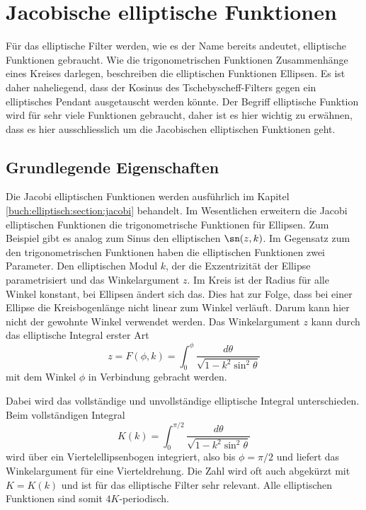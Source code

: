 \section{Jacobische elliptische Funktionen}

Für das elliptische Filter werden, wie es der Name bereits andeutet, elliptische Funktionen gebraucht.
Wie die trigonometrischen Funktionen Zusammenhänge eines Kreises darlegen, beschreiben die elliptischen Funktionen Ellipsen.
Es ist daher naheliegend, dass der Kosinus des Tschebyscheff-Filters gegen ein elliptisches Pendant ausgetauscht werden könnte.
Der Begriff elliptische Funktion wird für sehr viele Funktionen gebraucht, daher ist es hier wichtig zu erwähnen, dass es hier ausschliesslich um die Jacobischen elliptischen Funktionen geht.

\subsection{Grundlegende Eigenschaften}

Die Jacobi elliptischen Funktionen werden ausführlich im Kapitel \ref{buch:elliptisch:section:jacobi} behandelt.
Im Wesentlichen erweitern die Jacobi elliptischen Funktionen die trigonometrische Funktionen für Ellipsen.
Zum Beispiel gibt es analog zum Sinus den elliptischen $\sn(z, k)$.
Im Gegensatz zum den trigonometrischen Funktionen haben die elliptischen Funktionen zwei Parameter.
Den elliptischen Modul $k$, der die Exzentrizität der Ellipse parametrisiert und das Winkelargument $z$.
Im Kreis ist der Radius für alle Winkel konstant, bei Ellipsen ändert sich das.
Dies hat zur Folge, dass bei einer Ellipse die Kreisbogenlänge nicht linear zum Winkel verläuft.
Darum kann hier nicht der gewohnte Winkel verwendet werden.
Das Winkelargument $z$ kann durch das elliptische Integral erster Art
\begin{equation}
    z
    =
    F(\phi, k)
    =
    \int_{0}^{\phi}
    \frac{
        d\theta
    }{
        \sqrt{
            1-k^2 \sin^2 \theta
        }
    }
\end{equation}
mit dem Winkel $\phi$ in Verbindung gebracht werden.

Dabei wird das vollständige und unvollständige elliptische Integral unterschieden.
Beim vollständigen Integral
\begin{equation}
    K(k)
    =
    \int_{0}^{\pi / 2}
    \frac{
        d\theta
    }{
        \sqrt{
            1-k^2 \sin^2 \theta
        }
    }
\end{equation}
wird über ein Viertelellipsenbogen integriert, also bis $\phi=\pi/2$ und liefert das Winkelargument für eine Vierteldrehung.
Die Zahl wird oft auch abgekürzt mit $K = K(k)$ und ist für das elliptische Filter sehr relevant.
Alle elliptischen Funktionen sind somit $4K$-periodisch.

